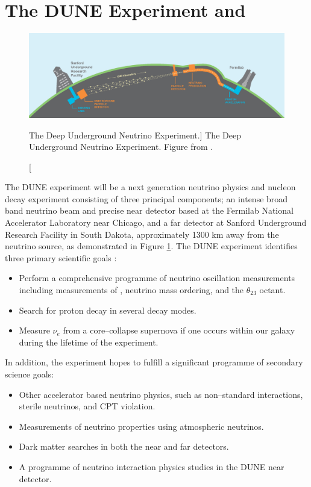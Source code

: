 \section{The DUNE Experiment and \protodune{}} \label{sec:pdsp_dune}

\begin{figure}

	\centering

	\includegraphics[width=\textwidth]{figures/dune_baseline.png}

	\caption
	[The Deep Underground Neutrino Experiment.]
	{The Deep Underground Neutrino Experiment. Figure from \cite{TODO}.}

	\label{fig:dune_baseline}

\end{figure}

The DUNE experiment will be a next generation neutrino physics and nucleon decay
experiment consisting of three principal components; an intense broad band 
neutrino beam and precise near detector based at the Fermilab National 
Accelerator Laboratory near Chicago, and a far detector at Sanford Underground 
Research Facility in South Dakota, approximately 1300 km away from the 
neutrino source, as demonstrated in Figure \ref{fig:dune_baseline}. The DUNE 
experiment identifies three primary scientific goals 
\cite{Abi:2020evt}:
\begin{itemize}
	\item Perform a comprehensive programme of neutrino oscillation measurements
		including measurements of \dcp{}, neutrino mass ordering, and the
		$\theta_{23}$ octant.
	\item Search for proton decay in several decay modes.
	\item Measure $\nu_e$ from a core--collapse supernova if one occurs within our
		galaxy during the lifetime of the experiment.
\end{itemize}
In addition, the experiment hopes to fulfill a significant programme of
secondary science goals:
\begin{itemize}
	\item Other accelerator based neutrino physics, such as non--standard
		interactions, sterile neutrinos, and CPT violation.
	\item Measurements of neutrino properties using atmospheric neutrinos.
	\item Dark matter searches in both the near and far detectors.
	\item A programme of neutrino interaction physics studies in the DUNE near
		detector.
\end{itemize}

